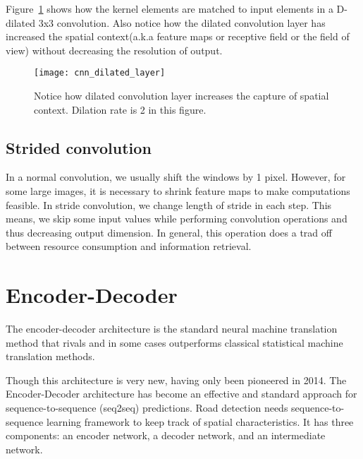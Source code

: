     Figure~\ref{fig:dilated_layer} shows how the kernel elements are matched to input elements in a D-dilated 3x3 convolution. Also notice how the dilated convolution layer has increased the spatial context(a.k.a feature maps or receptive field or the field of view) without decreasing the resolution of output.
    \begin{figure}
        \centering
        \texttt{[image: cnn\_dilated\_layer]}
        \caption[Dilated convolution layer]{Notice how dilated convolution layer increases the capture of spatial context. Dilation rate is 2 in this figure.}
        \label{fig:dilated_layer}
    \end{figure}


\subsection{Strided convolution}
    In a normal convolution, we usually shift the windows by 1 pixel. However, for some large images, it is necessary to shrink feature maps to make computations feasible. In stride convolution, we change length of stride in each step. This means, we skip some input values while performing convolution operations and thus decreasing output dimension. In general, this operation does a trad off between resource consumption and information retrieval.





\section{Encoder-Decoder}
The encoder-decoder architecture is the standard neural machine translation method that rivals and in some cases outperforms classical statistical machine translation methods.

Though this architecture is very new, having only been pioneered in 2014. The Encoder-Decoder architecture has become an effective and standard approach for sequence-to-sequence (seq2seq) predictions. Road detection needs sequence-to-sequence learning framework to keep track of spatial characteristics. It has three components: an encoder network, a decoder network, and an intermediate network.

